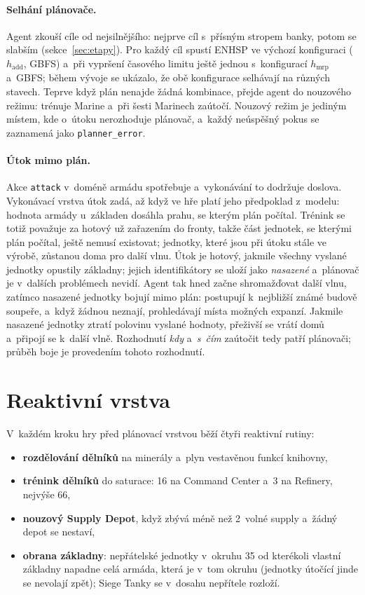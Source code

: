 \paragraph{Selhání plánovače.} Agent zkouší cíle od nejsilnějšího: nejprve cíl s~přísným stropem banky, potom se slabším (sekce~\ref{sec:etapy}). Pro každý cíl spustí ENHSP ve výchozí konfiguraci ($h_{\mathrm{add}}$, GBFS) a~při vypršení časového limitu ještě jednou s~konfigurací $h_{\mathrm{mrp}}$ a~GBFS; během vývoje se ukázalo, že obě konfigurace selhávají na různých stavech. Teprve když plán nenajde žádná kombinace, přejde agent do nouzového režimu: trénuje Marine a~při šesti Marinech zaútočí. Nouzový režim je jediným místem, kde o~útoku nerozhoduje plánovač, a~každý neúspěšný pokus se zaznamená jako \texttt{planner\_error}.

\paragraph{Útok mimo plán.} Akce \texttt{attack} v~doméně armádu spotřebuje a~vykonávání to dodržuje doslova. Vykonávací vrstva útok zadá, až když ve hře platí jeho předpoklad z~modelu: hodnota armády u~základen dosáhla prahu, se kterým plán počítal. Trénink se totiž považuje za hotový už zařazením do fronty, takže část jednotek, se kterými plán počítal, ještě nemusí existovat; jednotky, které jsou při útoku stále ve výrobě, zůstanou doma pro další vlnu. Útok je hotový, jakmile všechny vyslané jednotky opustily základny; jejich identifikátory se uloží jako \emph{nasazené} a~plánovač je v~dalších problémech nevidí. Agent tak hned začne shromažďovat další vlnu, zatímco nasazené jednotky bojují mimo plán: postupují k~nejbližší známé budově soupeře, a~když žádnou neznají, prohledávají místa možných expanzí. Jakmile nasazené jednotky ztratí polovinu vyslané hodnoty, přeživší se vrátí domů a~připojí se k~další vlně. Rozhodnutí \emph{kdy} a~\emph{s~čím} zaútočit tedy patří plánovači; průběh boje je provedením tohoto rozhodnutí.

\section{Reaktivní vrstva}
\label{sec:reaktivni}

V~každém kroku hry před plánovací vrstvou běží čtyři reaktivní rutiny:
\begin{itemize}
	\item \textbf{rozdělování dělníků} na minerály a~plyn vestavěnou funkcí knihovny,
	\item \textbf{trénink dělníků} do saturace: 16 na Command Center a~3 na Refinery, nejvýše 66,
	\item \textbf{nouzový Supply Depot}, když zbývá méně než 2~volné supply a~žádný depot se nestaví,
	\item \textbf{obrana základny}: nepřátelské jednotky v~okruhu 35 od kterékoli vlastní základny napadne celá armáda, která je v~tom okruhu (jednotky útočící jinde se nevolají zpět); Siege Tanky se v~dosahu nepřítele rozloží.
\end{itemize}

